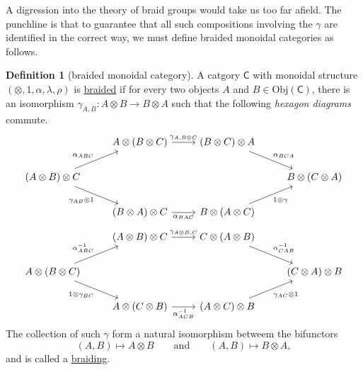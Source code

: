 \documentclass[a4paper,10pt]{scrreprt}
\newcommand{\defn}[1]{\ul{#1}}
\newcommand{\Obj}{\mathrm{Obj}}
\theoremstyle{definition}
\newtheorem{definition}{Definition}[section]
\theoremstyle{plain}
\theoremstyle{remark}
\begin{document}
A digression into the theory of braid groups would take us too far afield. The punchline is that to guarantee that all such compositions involving the $\gamma$ are identified in the correct way, we must define braided monoidal categories as follows.

\begin{definition}[braided monoidal category]
  \label{def:braidedmonoidalcategory}
  A catgory $\mathsf{C}$ with monoidal structure $(\otimes, 1, \alpha, \lambda, \rho)$ is \defn{braided} if for every two objects $A$ and $B \in \Obj(\mathsf{C})$, there is an isomorphism $\gamma_{A,B}\colon A \otimes B \to B \otimes A$ such that the following \emph{hexagon diagrams} commute.
  \begin{equation*}
    \begin{tikzcd}
      & A \otimes (B \otimes C) \arrow[r, "{\gamma_{A, B \otimes C}}"] & (B \otimes C) \otimes A \arrow[dr, "\alpha_{BCA}"] & \\
      (A \otimes B) \otimes C \arrow[ur, "\alpha_{ABC}"] \arrow[dr, swap, "\gamma_{AB} \otimes 1"] & & & B \otimes (C \otimes A) \\
      & (B \otimes A) \otimes C \arrow[r, swap, "\alpha_{BAC}"] & B \otimes (A \otimes C) \arrow[ur, swap, "1 \otimes \gamma"]
    \end{tikzcd}
  \end{equation*}
  \begin{equation*}
    \begin{tikzcd}
      & (A \otimes B) \otimes C \arrow[r, "{\gamma_{A \otimes B, C}}"] & C \otimes (A \otimes B) \arrow[dr, "\alpha^{-1}_{CAB}"] \\
      A \otimes (B \otimes C) \arrow[ur, "\alpha_{ABC}^{-1}"] \arrow[dr, swap, "1 \otimes \gamma_{BC}"] & & & (C \otimes A) \otimes B \\
      & A \otimes (C \otimes B) \arrow[r, swap, "\alpha^{-1}_{ACB}"] & (A \otimes C) \otimes B \arrow[ur, swap, "\gamma_{AC} \otimes 1"]
    \end{tikzcd} 
  \end{equation*}
  The collection of such $\gamma$ form a natural isomorphism betweem the bifunctors 
  \begin{equation*}
    (A, B) \mapsto A \otimes B\qquad\text{and}\qquad (A,B) \mapsto B \otimes A,
  \end{equation*}
  and is called a \defn{braiding}.
\end{definition}
\end{document}
